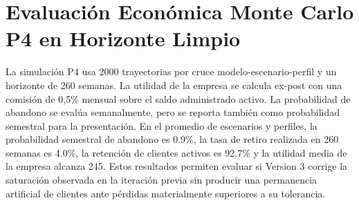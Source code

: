 \documentclass[11pt]{article}
\begin{document}
\section{Evaluación Económica Monte Carlo P4 en Horizonte Limpio}
La simulación P4 usa 2000 trayectorias por cruce modelo-escenario-perfil y un horizonte de 260 semanas. La utilidad de la empresa se calcula ex-post con una comisión de 0,5\% mensual sobre el saldo administrado activo. La probabilidad de abandono se evalúa semanalmente, pero se reporta también como probabilidad semestral para la presentación.
En el promedio de escenarios y perfiles, la probabilidad semestral de abandono es 0.9\%, la tasa de retiro realizada en 260 semanas es 4.0\%, la retención de clientes activos es 92.7\% y la utilidad media de la empresa alcanza 245. Estos resultados permiten evaluar si Version 3 corrige la saturación observada en la iteración previa sin producir una permanencia artificial de clientes ante pérdidas materialmente superiores a su tolerancia.
\begin{table}[H]
\centering
{}
\caption{Resultados P4 y comportamiento de clientes para Version 3.}
\label{tab:version_3:p4}
\end{table}
\end{document}
